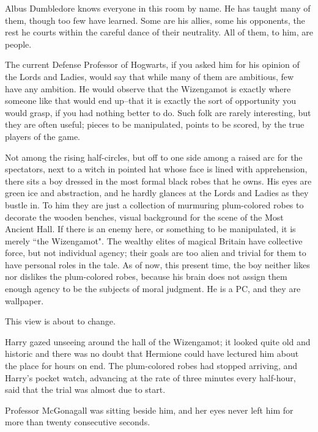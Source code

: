 Albus Dumbledore knows everyone in this room by name. He has taught many of them, though too few have learned. Some are his allies, some his opponents, the rest he courts within the careful dance of their neutrality. All of them, to him, are people.

The current Defense Professor of Hogwarts, if you asked him for his opinion of the Lords and Ladies, would say that while many of them are ambitious, few have any ambition. He would observe that the Wizengamot is exactly where someone like that would end up\---that it is exactly the sort of opportunity you would grasp, if you had nothing better to do. Such folk are rarely interesting, but they are often useful; pieces to be manipulated, points to be scored, by the true players of the game.

Not among the rising half-circles, but off to one side among a raised arc for the spectators, next to a witch in pointed hat whose face is lined with apprehension, there sits a boy dressed in the most formal black robes that he owns. His eyes are green ice and abstraction, and he hardly glances at the Lords and Ladies as they bustle in. To him they are just a collection of murmuring plum-colored robes to decorate the wooden benches, visual background for the scene of the Most Ancient Hall. If there is an enemy here, or something to be manipulated, it is merely ``the Wizengamot". The wealthy elites of magical Britain have collective force, but not individual agency; their goals are too alien and trivial for them to have personal roles in the tale. As of now, this present time, the boy neither likes nor dislikes the plum-colored robes, because his brain does not assign them enough agency to be the subjects of moral judgment. He is a PC, and they are wallpaper.

This view is about to change.

\later

Harry gazed unseeing around the hall of the Wizengamot; it looked quite old and historic and there was no doubt that Hermione could have lectured him about the place for hours on end. The plum-colored robes had stopped arriving, and Harry's pocket watch, advancing at the rate of three minutes every half-hour, said that the trial was almost due to start.

Professor McGonagall was sitting beside him, and her eyes never left him for more than twenty consecutive seconds.

